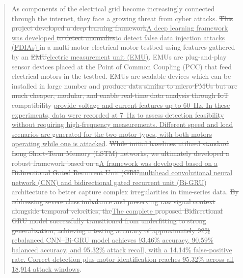 \documentclass[conference,onecolumn,letterpaper]{IEEEtran} %
\providecommand{\DIFadd}[1]{{\protect\color{blue} \sf #1}} %
\providecommand{\DIFdel}[1]{{\protect\color{red} \scriptsize #1}} %
\providecommand{\DIFaddbegin}{} %
\providecommand{\DIFaddend}{} %
\providecommand{\DIFdelbegin}{} %
\providecommand{\DIFdelend}{} %
\renewcommand{\DIFadd}[1]{{\protect\color{blue}\protect\uline{#1}}}
\renewcommand{\DIFdel}[1]{{\protect\color{red}\protect\sout{#1}}}
\begin{document}
\begin{abstract}
As components of the electrical grid become increasingly connected through the internet, they face a growing threat from cyber attacks. \DIFdelbegin \DIFdel{This project developed a deep learning framework}\DIFdelend \DIFaddbegin \DIFadd{A deep learning framework was developed }\DIFaddend  \DIFdelbegin \DIFdel{to detect anomalies}\DIFdelend \DIFaddbegin \DIFadd{to detect false data injection attacks (FDIAs) }\DIFaddend in a multi-motor electrical motor testbed using features gathered by an \DIFdelbegin \DIFdel{EMU}\DIFdelend \DIFaddbegin \DIFadd{electric measurement unit (EMU)}\DIFaddend . EMUs are plug-and-play sensor devices placed at the Point of Common Coupling (PCC) that feed electrical motors in the testbed. EMUs are scalable devices which can be installed in large number and \DIFdelbegin \DIFdel{produce data similar to micro-PMUs but are much cheaper, modular, and enable real-time data analysis through IoT compatibility }\DIFdelend \DIFaddbegin \DIFadd{provide voltage and current features up to 60~Hz. In these experiments, data were recorded at 7~Hz to assess detection feasibility without requiring high-frequency measurements. Different speed and load scenarios are generated for the two motor types, with both motors operating while one is attacked}\DIFaddend . 
\DIFdelbegin \DIFdel{While initial baselines utilized standard Long Short-Term Memory (LSTM) networks, we ultimately developed a robust framework based on a}\DIFdelend \DIFaddbegin \DIFadd{A framework was developed based on a }\DIFaddend \DIFdelbegin \DIFdel{Bidirectional Gated Recurrent Unit (GRU}\DIFdelend \DIFaddbegin \DIFadd{multihead convolutional neural network (CNN) and bidirectional gated recurrent unit (Bi-GRU}\DIFaddend ) architecture to better capture complex irregularities in time-series data. \DIFdelbegin \DIFdel{By addressing severe class imbalance and preserving raw signal context alongside temporal velocities, the}\DIFdelend \DIFaddbegin \DIFadd{The complete }\DIFaddend \DIFdelbegin \DIFdel{proposed Bidirectional GRU model successfully transitioned from underfitting to strong generalization, achieving a testing accuracy of approximately 92\% }\DIFdelend \DIFaddbegin \DIFadd{rebalanced CNN--Bi-GRU model achieves 93.46\% accuracy, 90.59\% balanced accuracy, and 95.32\% attack recall, with a 14.14\% false-positive rate. Correct detection plus motor identification reaches 95.32\% across all 18,914 attack windows}\DIFaddend .
\end{abstract}
\end{document}
